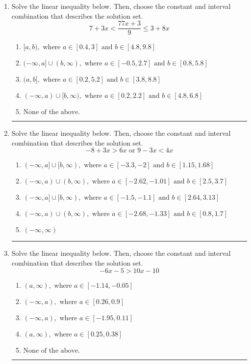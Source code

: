\documentclass[14pt]{extbook}
\newcommand{\litem}[1]{\item#1\hspace*{-1cm}\rule{\textwidth}{0.4pt}}
\begin{document}
\begin{enumerate}
{\begin{enumerate}[label=\Alph*.]
\end{enumerate} }
\litem{
Solve the linear inequality below. Then, choose the constant and interval combination that describes the solution set.\[ 7 + 3 x < \frac{77 x + 3}{9} \leq 3 + 8 x \]\begin{enumerate}[label=\Alph*.]
\item \( [a, b), \text{ where } a \in [0.4, 3] \text{ and } b \in [4.8, 9.8] \)
\item \( (-\infty, a] \cup (b, \infty), \text{ where } a \in [-0.5, 2.7] \text{ and } b \in [0.8, 5.8] \)
\item \( (a, b], \text{ where } a \in [0.2, 5.2] \text{ and } b \in [3.8, 8.8] \)
\item \( (-\infty, a) \cup [b, \infty), \text{ where } a \in [0.2, 2.2] \text{ and } b \in [4.8, 6.8] \)
\item \( \text{None of the above.} \)

\end{enumerate} }
\litem{
Solve the linear inequality below. Then, choose the constant and interval combination that describes the solution set.\[ -8 + 3 x > 6 x \text{ or } 9 - 3 x < 4 x \]\begin{enumerate}[label=\Alph*.]
\item \( (-\infty, a] \cup [b, \infty), \text{ where } a \in [-3.3, -2] \text{ and } b \in [1.15, 1.68] \)
\item \( (-\infty, a) \cup (b, \infty), \text{ where } a \in [-2.62, -1.01] \text{ and } b \in [2.5, 3.7] \)
\item \( (-\infty, a] \cup [b, \infty), \text{ where } a \in [-1.5, -1.1] \text{ and } b \in [2.64, 3.13] \)
\item \( (-\infty, a) \cup (b, \infty), \text{ where } a \in [-2.68, -1.33] \text{ and } b \in [0.8, 1.7] \)
\item \( (-\infty, \infty) \)

\end{enumerate} }
\litem{
Solve the linear inequality below. Then, choose the constant and interval combination that describes the solution set.\[ -6x -5 > 10x -10 \]\begin{enumerate}[label=\Alph*.]
\item \( (a, \infty), \text{ where } a \in [-1.14, -0.05] \)
\item \( (-\infty, a), \text{ where } a \in [0.26, 0.9] \)
\item \( (-\infty, a), \text{ where } a \in [-1.95, 0.11] \)
\item \( (a, \infty), \text{ where } a \in [0.25, 0.38] \)
\item \( \text{None of the above}. \)

\end{enumerate} }
\end{enumerate}
\end{document}
